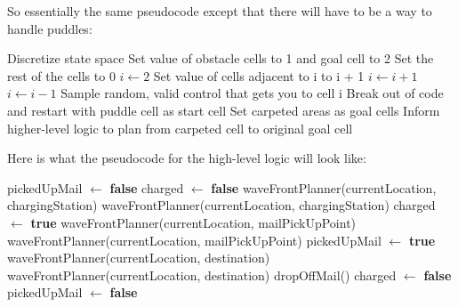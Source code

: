 \documentclass{article}
\begin{document}
So essentially the same pseudocode except that there will have to be a way to handle puddles:

\begin{algorithm}[H]
    \begin{algorithmic}[1]
        \STATE Discretize state space
        \STATE Set value of obstacle cells to 1 and goal cell to 2
        \STATE Set the rest of the cells to 0
        \STATE $i \gets 2$
            \STATE Set value of cells adjacent to i to i + 1
            \STATE $i \gets i + 1$
        \ENDWHILE
            \STATE $i \gets i - 1$
            \STATE Sample random, valid control that gets you to cell i
                \STATE Break out of code and restart with puddle cell as start cell
                \STATE Set carpeted areas as goal cells
                \STATE Inform higher-level logic to plan from carpeted cell to original goal cell
            \ENDIF
        \ENDWHILE
    \end{algorithmic}
\end{algorithm}

Here is what the pseudocode for the high-level logic will look like:

\begin{algorithm}[H]
    \begin{algorithmic}[1]
        \STATE pickedUpMail $\gets$ \textbf{false}
        \STATE charged $\gets$ \textbf{false}
                \STATE waveFrontPlanner(currentLocation, chargingStation)
                    \STATE waveFrontPlanner(currentLocation, chargingStation)
                \ENDWHILE
                \STATE charged $\gets$ \textbf{true}
            \ENDIF
                \STATE waveFrontPlanner(currentLocation, mailPickUpPoint)
                    \STATE waveFrontPlanner(currentLocation, mailPickUpPoint)
                \ENDWHILE
                \STATE pickedUpMail $\gets$ \textbf{true}
            \ELSE
                    \STATE waveFrontPlanner(currentLocation, destination)
                        \STATE waveFrontPlanner(currentLocation, destination)
                    \ENDWHILE
                    \STATE dropOffMail()
                \ENDFOR
                \STATE charged $\gets$ \textbf{false}
                \STATE pickedUpMail $\gets$ \textbf{false}
            \ENDIF
        \ENDWHILE
    \end{algorithmic}
\end{algorithm}
\end{document}
